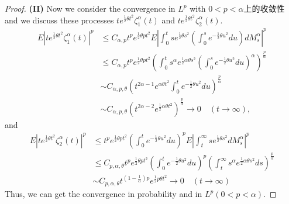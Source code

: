 \documentclass[11pt]{amsart}
\theoremstyle{plain}
\numberwithin{equation}{section}
\begin{document}
\begin{proof}
\textbf{(II)} Now we consider the convergence in $L^p$ with $0<p<\alpha$上的收敛性 and we discuss these processes $te^{\frac{1}{2}\theta t^2}\zeta_1^\alpha(t)$ and $te^{\frac{1}{2}\theta t^2}\zeta_2^\alpha(t)$.
\begin{equation*}
\begin{aligned}
E\left|te^{\frac{1}{2}\theta t^2}\zeta_1^\alpha(t)\right|^p& \leq C_{\alpha,p}t^p e^{\frac{1}{2}\theta pt^2}E\left|\int_0^t se^{\frac{1}{2}\theta s^2}\left(\int_0^s e^{-\frac{1}{2}\theta u^2}du\right)dM_s^\alpha \right|^p\\
&\leq C_{\alpha,p}t^p e^{\frac{1}{2}\theta pt^2}\left(\int_0^t s^\alpha e^{\frac{1}{2}\alpha \theta s^2}\left(\int_0^s e^{-\frac{1}{2}\theta u^2}du\right)^\alpha\right)^{\frac{p}{\alpha}}\\
&\sim C_{\alpha,p,\theta}\left(t^{2\alpha-1}e^{\alpha\theta t^2}\int_0^t e^{-\frac{1}{2}\theta u^2}du\right)^{\frac{p}{\alpha}}\\
&\sim C_{\alpha,p,\theta} \left(t^{2\alpha-2}e^{\frac{1}{2}\alpha\theta t^2}\right)^{\frac{p}{\alpha}}\longrightarrow 0\quad(t\rightarrow \infty),
\end{aligned}
\end{equation*}
and
\begin{equation*}
\begin{aligned}
E\left|te^{\frac{1}{2}\theta t^2}\zeta_2^\alpha(t)\right|^p &\leq t^p e^{\frac{1}{2}\theta pt^2}\left(\int_0^t e^{-\frac{1}{2}\theta u^2}du\right)^p E\left|\int_t^\infty se^{\frac{1}{2}\theta s^2}dM_s^\alpha\right|^p\\
&\leq C_{p,\alpha,\theta} t^p e^{\frac{1}{2}\theta pt^2}\left(\int_0^t e^{-\frac{1}{2}\theta u^2}du\right)^p\left(\int_t^\infty s^\alpha e^{\frac{1}{2}\alpha \theta s^2}ds\right)^{\frac{p}{\alpha}}\\
&\sim C_{p,\alpha,\theta}t^{(1-\frac{1}{\alpha})p}e^{\frac{1}{2}p\theta t^2}\longrightarrow 0 \quad (t\rightarrow\infty)
\end{aligned}
\end{equation*}
Thus, we can get the convergence in probability and in $L^p(0<p<\alpha)$.
\end{proof}
\end{document}
